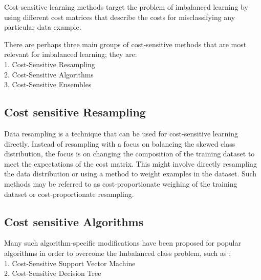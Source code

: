Cost-sensitive learning methods target the problem of imbalanced learning by using different cost matrices that describe the costs for misclassifying any particular data example.

There are perhaps three main groups of cost-sensitive methods that are most relevant for imbalanced learning; they are: \noindent \\

1. Cost-Sensitive Resampling \noindent \\
2. Cost-Sensitive Algorithms \noindent \\
3. Cost-Sensitive Ensembles \noindent \\


\subsection{Cost sensitive Resampling}
Data resampling is a technique that can be used for cost-sensitive learning directly. Instead of resampling with a focus on balancing the skewed class distribution, the focus is on changing the composition of the training dataset to meet the expectations of the cost matrix.
This might involve directly resampling the data distribution or using a method to weight examples in the dataset. Such methods may be referred to as cost-proportionate weighing of the training dataset or cost-proportionate resampling.\noindent \\


\subsection{Cost sensitive Algorithms}

Many such algorithm-specific modifications have been proposed for popular algorithms in order to overcome the Imbalanced class problem, such as : \noindent \\

1. Cost-Sensitive Support Vector Machine \noindent \\
2. Cost-Sensitive Decision Tree \noindent \\


